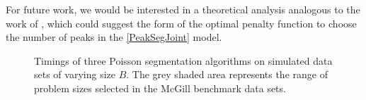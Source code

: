 \documentclass{article} %
\begin{document}
For future work, we would be interested in a theoretical analysis
analogous to the work of \citet{cleynen2013segmentation}, which could
suggest the form of the optimal penalty function to choose the number
of peaks in the \ref{PeakSegJoint} model.

\begin{figure}[b!]
  \centering
  
  \vskip -0.5cm
  \caption{Timings of three Poisson segmentation algorithms on
    simulated data sets of varying size $B$. The grey shaded area
    represents the range of problem sizes selected in the McGill
     benchmark data sets. }
  \label{fig:timings}
\end{figure}

\newpage




\end{document}
